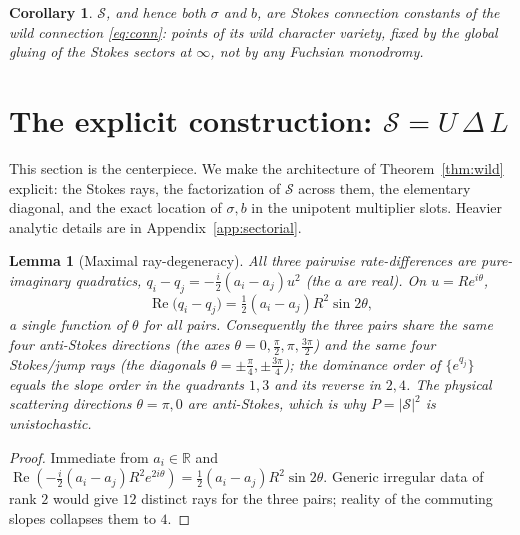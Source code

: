 \documentclass[11pt]{article}
\newtheorem{lemma}{Lemma}
\newtheorem{corollary}{Corollary}
\theoremstyle{definition}
\theoremstyle{remark}
\newcommand{\Scat}{\mathcal{S}}
\renewcommand{\Re}{\operatorname{Re}}
\begin{document}
\begin{corollary}\label{cor:stokes}
$\Scat$, and hence both $\sigma$ and $b$, are \emph{Stokes connection constants} of the wild
connection \eqref{eq:conn}: points of its wild character variety, fixed by the global gluing
of the Stokes sectors at $\infty$, not by any Fuchsian monodromy.
\end{corollary}

\section{The explicit construction: $\Scat=U\,\Delta\,L$}\label{sec:constr}

This section is the centerpiece. We make the architecture of Theorem~\ref{thm:wild} explicit:
the Stokes rays, the factorization of $\Scat$ across them, the elementary diagonal, and the
exact location of $\sigma,b$ in the unipotent multiplier slots. Heavier analytic details are
in Appendix~\ref{app:sectorial}.

\begin{lemma}[Maximal ray-degeneracy]\label{lem:rays}
All three pairwise rate-differences are pure-imaginary quadratics,
$q_i-q_j=-\tfrac{i}{2}(a_i-a_j)u^2$ (the $a$ are real). On $u=Re^{i\theta}$,
\[
\Re\big(q_i-q_j\big)=\tfrac12(a_i-a_j)R^2\sin 2\theta,
\]
a single function of $\theta$ for \emph{all} pairs. Consequently the three pairs share the
same four \emph{anti-Stokes} directions (the axes $\theta=0,\tfrac\pi2,\pi,\tfrac{3\pi}2$)
and the same four \emph{Stokes/jump} rays (the diagonals $\theta=\pm\tfrac\pi4,\pm\tfrac{3\pi}4$);
the dominance order of $\{e^{q_j}\}$ equals the slope order in the quadrants $1,3$ and its
reverse in $2,4$. The physical scattering directions $\theta=\pi,0$ are anti-Stokes, which is
why $P=|\Scat|^2$ is unistochastic.
\end{lemma}

\begin{proof}
Immediate from $a_i\in\mathbb{R}$ and $\Re(-\tfrac{i}{2}(a_i-a_j)R^2 e^{2i\theta})
=\tfrac12(a_i-a_j)R^2\sin2\theta$. Generic irregular data of rank $2$ would give $12$
distinct rays for the three pairs; reality of the commuting slopes collapses them to $4$.
\end{proof}
\end{document}
